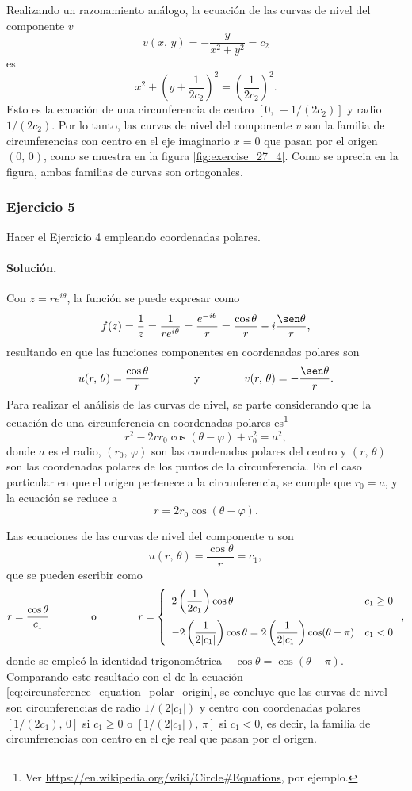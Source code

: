 \documentclass[a4paper]{report}
\begin{document}
Realizando un razonamiento análogo, la ecuación de las curvas de nivel del componente \(v\) 
\[
 v(x,\,y)=-\frac{y}{x^2+y^2}=c_2
\]
es
\[
 x^2+\left(y+\frac{1}{2c_2}\right)^2=\left(\frac{1}{2c_2}\right)^2.
\]
Esto es la ecuación de una circunferencia de centro \([0,\,-1/(2c_2)]\) y radio \(1/(2c_2)\). Por lo tanto, las curvas de nivel del componente \(v\) son la familia de circunferencias con centro en el eje imaginario \(x=0\) que pasan por el origen \((0,\,0)\), como se muestra en la figura \ref{fig:exercise_27_4}. Como se aprecia en la figura, ambas familias de curvas son ortogonales.

\subsubsection{Ejercicio 5}

Hacer el Ejercicio 4 empleando coordenadas polares. 

\paragraph{Solución.} Con \(z=re^{i\theta}\), la función se puede expresar como
\[
 f(z)=\frac{1}{z}=\frac{1}{re^{i\theta}}=\frac{e^{-i\theta}}{r}=\frac{\cos\theta}{r}-i\frac{\sen\theta}{r},
\]
resultando en que las funciones componentes en coordenadas polares son
\[
 u(r,\,\theta)=\frac{\cos\theta}{r}
 \qquad\qquad\textrm{y}\qquad\qquad
 v(r,\,\theta)=-\frac{\sen\theta}{r}.
\]
Para realizar el análisis de las curvas de nivel, se parte considerando que la ecuación de una circunferencia en coordenadas polares es\footnote{Ver \url{https://en.wikipedia.org/wiki/Circle\#Equations}, por ejemplo.}
\[
 r^2-2rr_0\cos(\theta-\varphi)+r_0^2=a^2,
\]
donde \(a\) es el radio, \((r_0,\,\varphi)\) son las coordenadas polares del centro y \((r,\,\theta)\) son las coordenadas polares de los puntos de la circunferencia. En el caso particular en que el origen pertenece a la circunferencia, se cumple que \(r_0=a\), y la ecuación se reduce a
\begin{equation}\label{eq:circunsference_equation_polar_origin}
 r=2r_0\cos(\theta-\varphi).
\end{equation}

Las ecuaciones de las curvas de nivel del componente \(u\) son
\[
 u(r,\,\theta)=\frac{\cos\theta}{r}=c_1,
\]
que se pueden escribir como
\[
 r=\frac{\cos\theta}{c_1}
 \qquad\qquad\textrm{o}\qquad\qquad
 r=\left\{ 
 \begin{array}{ll}
  2\left(\dfrac{1}{2c_1}\right)\cos\theta & c_1\geq0\\[\bigskipamount]
  -2\left(\dfrac{1}{2|c_1|}\right)\cos\theta=2\left(\dfrac{1}{2|c_1|}\right)\cos(\theta-\pi) & c_1<0
 \end{array}
 \right.,
\]
donde se empleó la identidad trigonométrica \(-\cos\theta=\cos(\theta-\pi)\).
Comparando este resultado con el de la ecuación \ref{eq:circunsference_equation_polar_origin}, se concluye que las curvas de nivel son circunferencias de radio \(1/(2|c_1|)\) y centro con coordenadas polares \([1/(2c_1),\,0]\) si \(c_1\geq0\) o \([1/(2|c_1|),\,\pi]\) si \(c_1<0\), es decir, la familia de circunferencias con centro en el eje real que pasan por el origen.
\end{document}
